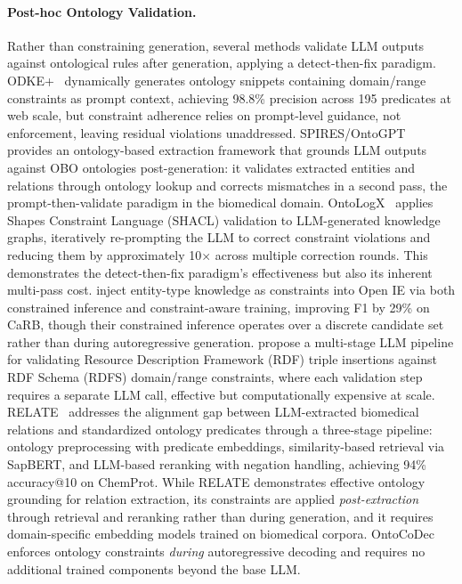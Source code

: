 \paragraph{Post-hoc Ontology Validation.}
Rather than constraining generation, several methods validate LLM outputs against ontological rules after generation, applying a detect-then-fix paradigm.
ODKE+~\cite{khorshidi2025odke} dynamically generates ontology snippets containing domain/range constraints as prompt context, achieving 98.8\% precision across 195 predicates at web scale, but constraint adherence relies on prompt-level guidance, not enforcement, leaving residual violations unaddressed.
SPIRES/OntoGPT~\cite{spires_2024} provides an ontology-based extraction framework that grounds LLM outputs against OBO ontologies post-generation: it validates extracted entities and relations through ontology lookup and corrects mismatches in a second pass, the prompt-then-validate paradigm in the biomedical domain.
OntoLogX~\cite{ontologx_2025} applies Shapes Constraint Language (SHACL) validation to LLM-generated knowledge graphs, iteratively re-prompting the LLM to correct constraint violations and reducing them by approximately 10$\times$ across multiple correction rounds. This demonstrates the detect-then-fix paradigm's effectiveness but also its inherent multi-pass cost.
\citet{upadhyay2023openie} inject entity-type knowledge as constraints into Open IE via both constrained inference and constraint-aware training, improving F1 by 29\% on CaRB, though their constrained inference operates over a discrete candidate set rather than during autoregressive generation.
\citet{regino2025kgcurator} propose a multi-stage LLM pipeline for validating Resource Description Framework (RDF) triple insertions against RDF Schema (RDFS) domain/range constraints, where each validation step requires a separate LLM call, effective but computationally expensive at scale.
RELATE~\cite{olasunkanmi2025relate} addresses the alignment gap between LLM-extracted biomedical relations and standardized ontology predicates through a three-stage pipeline: ontology preprocessing with predicate embeddings, similarity-based retrieval via SapBERT, and LLM-based reranking with negation handling, achieving 94\% accuracy@10 on ChemProt.
While RELATE demonstrates effective ontology grounding for relation extraction, its constraints are applied \emph{post-extraction} through retrieval and reranking rather than during generation, and it requires domain-specific embedding models trained on biomedical corpora.
OntoCoDec enforces ontology constraints \emph{during} autoregressive decoding and requires no additional trained components beyond the base LLM.
